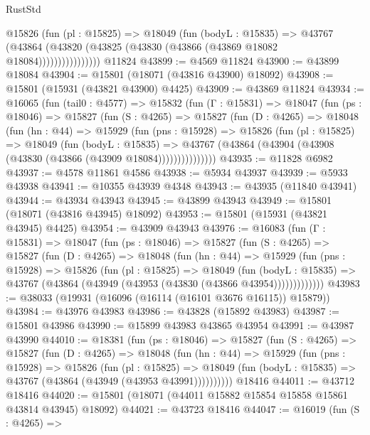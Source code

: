 \begin{lexlean}{RustStd}
\begin{coremodule}
                  @15826
                    (fun (pl : @15825) =>
                    @18049
                      (fun (bodyL : @15835) =>
                      @43767
                        (@43864
                          (@43820 (@43825 (@43830 (@43866 (@43869 @18082 @18084))))))))))))))))
    @11824
@43899 := @4569 @11824
@43900 := @43899 @18084
@43904 := @15801 (@18071 (@43816 @43900) @18092)
@43908 := @15801 (@15931 (@43821 @43900) @4425)
@43909 := @43869 @11824
@43934 := @16065
    (fun (tail0 : @4577) =>
    @15832
      (fun (Γ : @15831) =>
      @18047
        (fun (ps : @18046) =>
        @15827
          (fun (S : @4265) =>
          @15827
            (fun (D : @4265) =>
            @18048
              (fun (hn : @44) =>
              @15929
                (fun (pns : @15928) =>
                @15826
                  (fun (pl : @15825) =>
                  @18049
                    (fun (bodyL : @15835) =>
                    @43767 (@43864 (@43904 (@43908 (@43830 (@43866 (@43909 @18084)))))))))))))))
@43935 := @11828 @6982
@43937 := @4578 @11861 @4586
@43938 := @5934 @43937
@43939 := @5933 @43938
@43941 := @10355 @43939 @4348
@43943 := @43935 (@11840 @43941)
@43944 := @43934 @43943
@43945 := @43899 @43943
@43949 := @15801 (@18071 (@43816 @43945) @18092)
@43953 := @15801 (@15931 (@43821 @43945) @4425)
@43954 := @43909 @43943
@43976 := @16083
    (fun (Γ : @15831) =>
    @18047
      (fun (ps : @18046) =>
      @15827
        (fun (S : @4265) =>
        @15827
          (fun (D : @4265) =>
          @18048
            (fun (hn : @44) =>
            @15929
              (fun (pns : @15928) =>
              @15826
                (fun (pl : @15825) =>
                @18049
                  (fun (bodyL : @15835) =>
                  @43767 (@43864 (@43949 (@43953 (@43830 (@43866 @43954)))))))))))))
@43983 := @38033 (@19931 (@16096 (@16114 (@16101 @3676 @16115)) @15879))
@43984 := @43976 @43983
@43986 := @43828 (@15892 @43983)
@43987 := @15801 @43986
@43990 := @15899 @43983 @43865 @43954
@43991 := @43987 @43990
@44010 := @18381
    (fun (ps : @18046) =>
    @15827
      (fun (S : @4265) =>
      @15827
        (fun (D : @4265) =>
        @18048
          (fun (hn : @44) =>
          @15929
            (fun (pns : @15928) =>
            @15826
              (fun (pl : @15825) =>
              @18049 (fun (bodyL : @15835) => @43767 (@43864 (@43949 (@43953 @43991))))))))))
    @18416
@44011 := @43712 @18416
@44020 := @15801 (@18071 (@44011 @15882 @15854 @15858 @15861 @43814 @43945) @18092)
@44021 := @43723 @18416
@44047 := @16019
    (fun (S : @4265) =>

\end{coremodule}
\end{lexlean}
